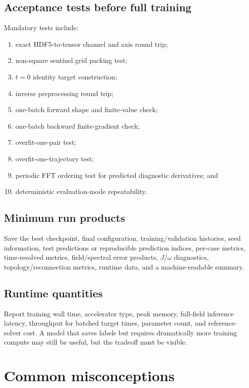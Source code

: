 \documentclass[11pt]{article}
\begin{document}
\subsection{Acceptance tests before full training}
Mandatory tests include:
\begin{enumerate}
  \item exact HDF5-to-tensor channel and axis round trip;
  \item non-square sentinel grid packing test;
  \item $t=0$ identity target construction;
  \item inverse preprocessing round trip;
  \item one-batch forward shape and finite-value check;
  \item one-batch backward finite-gradient check;
  \item overfit-one-pair test;
  \item overfit-one-trajectory test;
  \item periodic FFT ordering test for predicted diagnostic derivatives; and
  \item deterministic evaluation-mode repeatability.
\end{enumerate}

\subsection{Minimum run products}
Save the best checkpoint, final configuration, training/validation histories, seed information, test predictions or reproducible prediction indices, per-case metrics, time-resolved metrics, field/spectral error products, $J/\omega$ diagnostics, topology/reconnection metrics, runtime data, and a machine-readable summary.

\subsection{Runtime quantities}
Report training wall time, accelerator type, peak memory, full-field inference latency, throughput for batched target times, parameter count, and reference-solver cost. A model that saves labels but requires dramatically more training compute may still be useful, but the tradeoff must be visible.

\section{Common misconceptions}
\label{sec:misconceptions}
\end{document}
